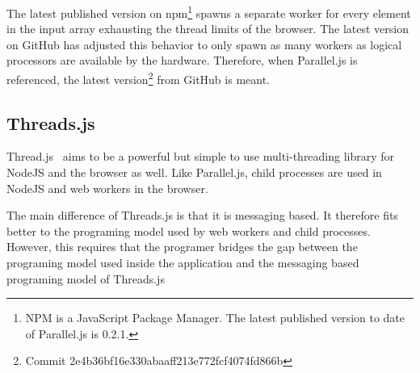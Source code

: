 The latest published version on npm\footnote{NPM is a JavaScript Package Manager. The latest published version to date of Parallel.js is 0.2.1.} spawns a separate worker for every element in the input array exhausting the thread limits of the browser. The latest version on GitHub has adjusted this behavior to only spawn as many workers as logical processors are available by the hardware. Therefore, when Parallel.js is referenced, the latest version\footnote{Commit 2e4b36bf16e330abaaff213e772fcf4074fd866b} from GitHub is meant.

\subsection{Threads.js}
Thread.js~\cite{Wermke2016} aims to be a powerful but simple to use multi-threading library for NodeJS and the browser as well. Like Parallel.js, child processes are used in NodeJS and web workers in the browser.

The main difference of Threads.js is that it is messaging based. It therefore fits better to the programing model used by web workers and child processes. However, this requires that the programer bridges the gap between the programing model used inside the application and the messaging based programing model of Threads.js